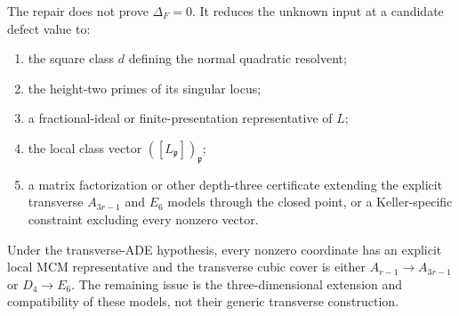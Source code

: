 \begin{remark}
\label{rem:revised-cubic-task}
The repair does not prove \(\Delta_F=0\).  It reduces the unknown input at a
candidate defect value to:
\begin{enumerate}[label=(\arabic*)]
\item the square class \(d\) defining the normal quadratic resolvent;
\item the height-two primes of its singular locus;
\item a fractional-ideal or finite-presentation representative of \(L\);
\item the local class vector \(([L_\mathfrak p])_\mathfrak p\);
\item a matrix factorization or other depth-three certificate extending the
explicit transverse \(A_{3r-1}\) and \(E_6\) models through the closed point,
or a Keller-specific constraint excluding every nonzero vector.
\end{enumerate}
Under the transverse-ADE hypothesis, every nonzero coordinate has an explicit
local MCM representative and the transverse cubic cover is either
\(A_{r-1}\to A_{3r-1}\) or \(D_4\to E_6\).  The remaining issue is the
three-dimensional extension and compatibility of these models, not their
generic transverse construction.
\end{remark}
